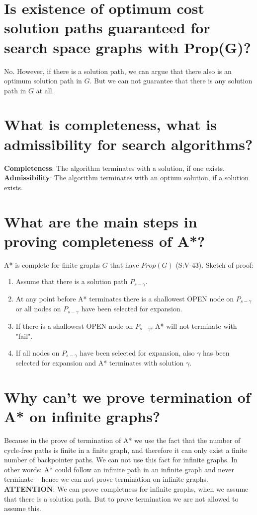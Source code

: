\documentclass[12pt, a4paper]{article}
\begin{document}
\section{Is existence of optimum cost solution paths guaranteed for search space graphs with Prop(G)?}
No. However, if there is a solution path, we can argue that there also is an optimum solution path in $G$. But we can not guarantee that there is any solution path in $G$ at all.

\section{What is completeness, what is admissibility for search algorithms?}
\textbf{Completeness}: The algorithm terminates with a solution, if one exists. \\
\textbf{Admissibility}: The algorithm terminates with an optium solution, if a solution exists.

\section{What are the main steps in proving completeness of A*?}
A* is complete for finite graphs $G$ that have $Prop(G)$ (S:V-43). Sketch of proof:
\begin{enumerate}
\item Assume that there is a solution path $P_{s-\gamma}$.
\item At any point before A* terminates there is a shallowest OPEN node on $P_{s-\gamma}$ or all nodes on $P_{s-\gamma}$ have been selected for expansion.
\item If there is a shallowest OPEN node on $P_{s-\gamma}$, A* will not terminate with "fail".
\item If all nodes on $P_{s-\gamma}$ have been selected for expansion, also $\gamma$ has been selected for expansion and A* terminates with solution $\gamma$.
\end{enumerate}

\section{Why can’t we prove termination of A* on infinite graphs?}
Because in the prove of termination of A* we use the fact that the number of cycle-free paths is finite in a finite graph, and therefore it can only exist a finite number of backpointer paths. We can not use this fact for infinite graphs. In other words: A* could follow an infinite path in an infinite graph and never terminate – hence we can not prove termination on infinite graphs. \\
\textbf{ATTENTION}: We can prove completness for infinite graphs, when we assume that there is a solution path. But to prove termination we are not allowed to assume this.
\end{document}
